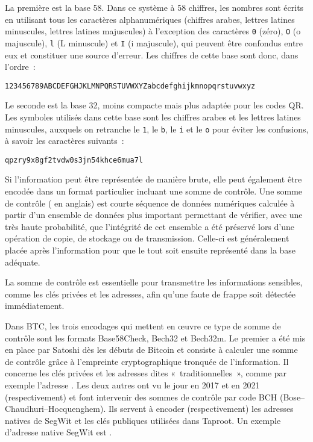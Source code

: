 La première est la base 58. Dans ce système à 58 chiffres, les nombres sont écrits en utilisant tous les caractères alphanumériques (chiffres arabes, lettres latines minuscules, lettres latines majuscules) à l'exception des caractères \verb?0? (zéro), \verb?O? (o majuscule), \verb?l? (L minuscule) et \verb?I? (i majuscule), qui peuvent être confondus entre eux et constituer une source d'erreur. Les chiffres de cette base sont donc, dans l'ordre~:

\begin{verbatim}
123456789ABCDEFGHJKLMNPQRSTUVWXYZabcdefghijkmnopqrstuvwxyz
\end{verbatim}


Le seconde est la base 32, moins compacte mais plus adaptée pour les codes QR. Les symboles utilisés dans cette base sont les chiffres arabes et les lettres latines minuscules, auxquels on retranche le \verb?1?, le \verb?b?, le \verb?i? et le \verb?o? pour éviter les confusions, à savoir les caractères suivants~: 

\begin{verbatim}
qpzry9x8gf2tvdw0s3jn54khce6mua7l
\end{verbatim}


Si l'information peut être représentée de manière brute, elle peut également être encodée dans un format particulier incluant une somme de contrôle. Une somme de contrôle ( en anglais) est courte séquence de données numériques calculée à partir d'un ensemble de données plus important permettant de vérifier, avec une très haute probabilité, que l'intégrité de cet ensemble a été préservé lors d'une opération de copie, de stockage ou de transmission. Celle-ci est généralement placée après l'information pour que le tout soit ensuite représenté dans la base adéquate.

La somme de contrôle est essentielle pour transmettre les informations sensibles, comme les clés privées et les adresses, afin qu'une faute de frappe soit détectée immédiatement.

Dans BTC, les trois encodages qui mettent en œuvre ce type de somme de contrôle sont les formats Base58Check, Bech32 et Bech32m. Le premier a été mis en place par Satoshi dès les débuts de Bitcoin et consiste à calculer une somme de contrôle grâce à l'empreinte cryptographique tronquée de l'information. Il concerne les clés privées et les adresses dites «~traditionnelles~», comme par exemple l'adresse . Les deux autres ont vu le jour en 2017 et en 2021 (respectivement) et font intervenir des sommes de contrôle par code BCH (Bose–Chaudhuri–Hocquenghem). Ils servent à encoder (respectivement) les adresses natives de SegWit et les clés publiques utilisées dans Taproot. Un exemple d'adresse native SegWit est .

